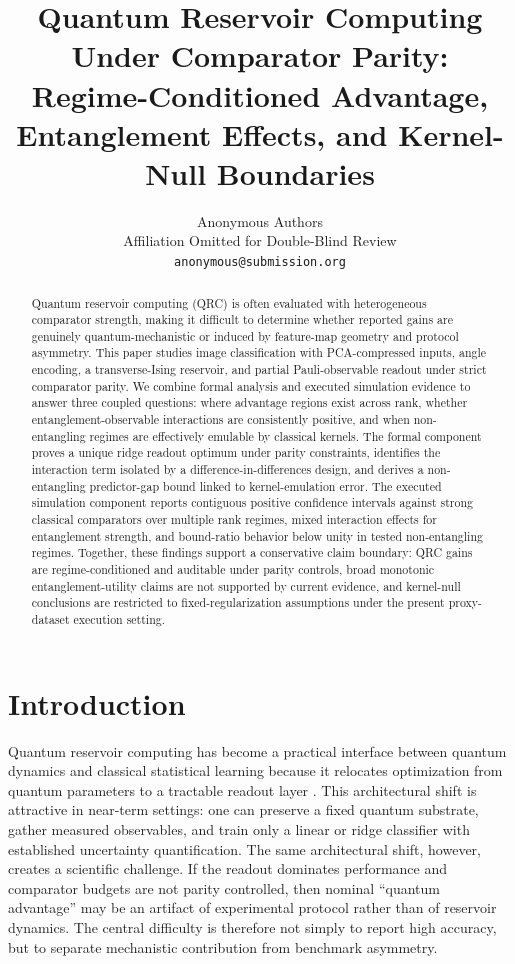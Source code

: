 \documentclass{article} %
\title{Quantum Reservoir Computing Under Comparator Parity:\\Regime-Conditioned Advantage, Entanglement Effects, and Kernel-Null Boundaries}
\author{Anonymous Authors \\
Affiliation Omitted for Double-Blind Review \\
\texttt{anonymous@submission.org}}
\begin{document}
\maketitle

\begin{abstract}
Quantum reservoir computing (QRC) is often evaluated with heterogeneous comparator strength, making it difficult to determine whether reported gains are genuinely quantum-mechanistic or induced by feature-map geometry and protocol asymmetry. This paper studies image classification with PCA-compressed inputs, angle encoding, a transverse-Ising reservoir, and partial Pauli-observable readout under strict comparator parity. We combine formal analysis and executed simulation evidence to answer three coupled questions: where advantage regions exist across rank, whether entanglement-observable interactions are consistently positive, and when non-entangling regimes are effectively emulable by classical kernels. The formal component proves a unique ridge readout optimum under parity constraints, identifies the interaction term isolated by a difference-in-differences design, and derives a non-entangling predictor-gap bound linked to kernel-emulation error. The executed simulation component reports contiguous positive confidence intervals against strong classical comparators over multiple rank regimes, mixed interaction effects for entanglement strength, and bound-ratio behavior below unity in tested non-entangling regimes. Together, these findings support a conservative claim boundary: QRC gains are regime-conditioned and auditable under parity controls, broad monotonic entanglement-utility claims are not supported by current evidence, and kernel-null conclusions are restricted to fixed-regularization assumptions under the present proxy-dataset execution setting.
\end{abstract}

\providecommand{\toprule}{\hline}
\providecommand{\midrule}{\hline}
\providecommand{\bottomrule}{\hline}

\section{Introduction}\label{sec:introduction}
Quantum reservoir computing has become a practical interface between quantum dynamics and classical statistical learning because it relocates optimization from quantum parameters to a tractable readout layer \citep{S001,S003,S004,S023,S033,S039}. This architectural shift is attractive in near-term settings: one can preserve a fixed quantum substrate, gather measured observables, and train only a linear or ridge classifier with established uncertainty quantification. The same architectural shift, however, creates a scientific challenge. If the readout dominates performance and comparator budgets are not parity controlled, then nominal ``quantum advantage'' may be an artifact of experimental protocol rather than of reservoir dynamics. The central difficulty is therefore not simply to report high accuracy, but to separate mechanistic contribution from benchmark asymmetry.
\end{document}
